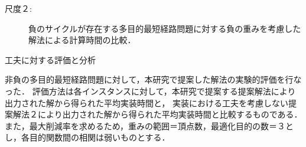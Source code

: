 \documentclass[12pt]{optlab-bachelor}
\begin{document}
\begin{description}
  \item[尺度２:]
  負のサイクルが存在する多目的最短経路問題に対する負の重みを考慮した解法による計算時間の比較．


\end{description}

\begin{description}
  \item[工夫に対する評価と分析]
\end{description}

非負の多目的最短経路問題に対して，本研究で提案した解法の実験的評価を行なった．
評価方法は各インスタンスに対して，本研究で提案する提案解法により出力された解から得られた平均実装時間と，
実装における工夫を考慮しない提案解法２により出力された解から得られた平均実装時間と比較するものである．
また，最大削減率を求めるため，重みの範囲＝頂点数，最適化目的の数＝３とし，各目的関数間の相関は弱いものとする．
\end{document}
